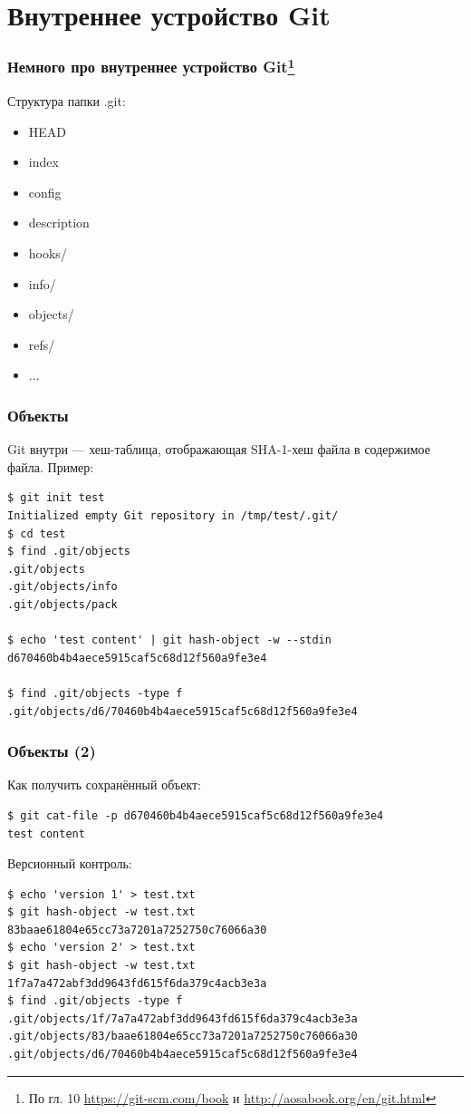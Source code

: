 \documentclass[xetex,mathserif,serif]{beamer}
\begin{document}
	\section{Внутреннее устройство Git}

	\begin{frame}
		\frametitle{Немного про внутреннее устройство Git\footnote{\tiny{По гл. 10 \url{https://git-scm.com/book} и \url{http://aosabook.org/en/git.html}}}}
		Структура папки .git:
		\begin{itemize}
			\item HEAD
			\item index
			\item config
			\item description
			\item hooks/
			\item info/
			\item objects/
			\item refs/
			\item ...
		\end{itemize}
	\end{frame}

	\begin{frame}[fragile]
		\frametitle{Объекты}
		Git внутри --- хеш-таблица, отображающая SHA-1-хеш файла в содержимое файла. Пример:
		\begin{verbatim}
$ git init test
Initialized empty Git repository in /tmp/test/.git/
$ cd test
$ find .git/objects
.git/objects
.git/objects/info
.git/objects/pack

$ echo 'test content' | git hash-object -w --stdin
d670460b4b4aece5915caf5c68d12f560a9fe3e4

$ find .git/objects -type f
.git/objects/d6/70460b4b4aece5915caf5c68d12f560a9fe3e4
		\end{verbatim}
\end{frame}

	\begin{frame}[fragile]
		\frametitle{Объекты (2)}
		Как получить сохранённый объект:
		\begin{verbatim}
$ git cat-file -p d670460b4b4aece5915caf5c68d12f560a9fe3e4
test content
		\end{verbatim}

		Версионный контроль:
		\begin{verbatim}
$ echo 'version 1' > test.txt
$ git hash-object -w test.txt
83baae61804e65cc73a7201a7252750c76066a30
$ echo 'version 2' > test.txt
$ git hash-object -w test.txt
1f7a7a472abf3dd9643fd615f6da379c4acb3e3a
$ find .git/objects -type f
.git/objects/1f/7a7a472abf3dd9643fd615f6da379c4acb3e3a
.git/objects/83/baae61804e65cc73a7201a7252750c76066a30
.git/objects/d6/70460b4b4aece5915caf5c68d12f560a9fe3e4
		\end{verbatim}
\end{frame}
\end{document}
